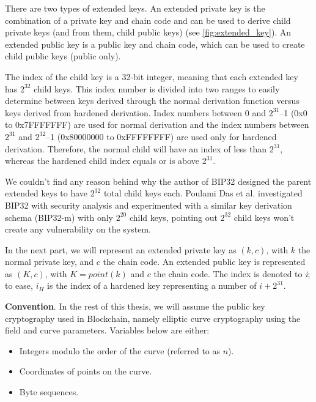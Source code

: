 There are two types of extended keys. An extended private key is the combination of a private key and chain code and can be used to derive child private keys (and from them, child public keys) (see \autoref{fig:extended_key}). An extended public key is a public key and chain code, which can be used to create child public keys (public only).

The index of the child key is a 32-bit integer, meaning that each extended key has $2^{32}$ child keys. This index number is divided into two ranges to easily determine between keys derived through the normal derivation function versus keys derived from hardened derivation. Index numbers between 0 and $2^{31}$–1 (0x0 to 0x7FFFFFFF) are used for normal derivation and the index numbers between $2^{31}$ and $2^{32}$–1 (0x80000000 to 0xFFFFFFFF) are used only for hardened derivation. Therefore, the normal child will have an index of less than $2^{31}$, whereas the hardened child index equals or is above  $2^{31}$.

We couldn’t find any reason behind why the author of BIP32 designed the parent extended keys to have $2^{32}$ total child keys each. Poulami Das et al. \cite{DBLP:conf/ccs/0003EFL021} investigated BIP32 with security analysis and experimented with a similar key derivation schema (BIP32-m) with only $2^{20}$ child keys, pointing out $2^{32}$ child keys won’t create any vulnerability on the system.

In the next part, we will represent an extended private key as $(k, c)$, with $k$ the normal private key, and $c$ the chain code. An extended public key is represented as $(K, c)$, with $K = point(k)$ and $c$ the chain code. The index is denoted to \textit{i}; to ease, $i_H$ is the index of a hardened key representing a number of $i+2^{31}$.

\bigskip
{\textbf{Convention}}. In the rest of this thesis, we will assume the public key cryptography used in Blockchain, namely elliptic curve cryptography using the field and curve parameters. Variables below are either:

\begin{itemize}
    \item Integers modulo the order of the curve (referred to as $n$).

    \item Coordinates of points on the curve.

    \item Byte sequences.
\end{itemize}


